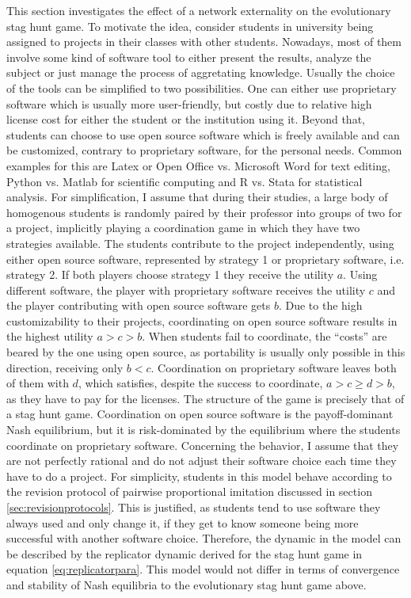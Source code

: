 \label{sec:simplemodel}
This section investigates the effect of a network externality on the
evolutionary stag hunt game.
To motivate the idea, consider students in university being assigned to
projects in their classes with other students. Nowadays, most of them 
involve some kind of software tool to either present the results, analyze 
the subject or just manage the process of aggretating 
knowledge. Usually the choice of the tools can be simplified to two 
possibilities. One can either use proprietary software
which is usually more user-friendly, but costly due to relative high 
license cost for either the student or the institution using it. 
Beyond that, students can choose to use open source software which is freely
available and can be customized, contrary to proprietary software,
for the personal needs. Common examples for this are Latex or Open Office
vs. Microsoft Word for text editing, Python vs. Matlab for scientific 
computing and R vs. Stata for statistical analysis.
For simplification, I assume that during their studies, a large body of 
homogenous students is randomly paired by their professor into groups of two 
for a project, implicitly playing a coordination game in which they have two 
strategies available. The students contribute to the project 
independently, using either open source software, 
represented by strategy 1 or proprietary software, i.e. strategy 2.
If both players choose strategy 1 they receive 
the utility $a$. Using different software, the player with 
proprietary software receives the utility $c$ and
the player contributing with open source software gets $b$.
Due to the high customizability to their projects, coordinating on open
source software results in the highest utility $a>c>b$.
When students fail to coordinate, the ``costs'' are beared
by the one using open source, as portability is usually only possible in 
this direction, receiving only $b<c$.
Coordination on proprietary software leaves both of them with $d$, which 
satisfies, despite the success to coordinate, $a> c\geq d>b$, as they have to
pay for the licenses. 
The structure of the game is precisely that of a stag hunt game. 
Coordination on open source software is the payoff-dominant Nash equilibrium,
but it is risk-dominated by the equilibrium where the students coordinate on
proprietary software. 
Concerning the behavior, I assume that they are not perfectly rational and
do not adjust their software choice each time they have to do a project.
For simplicity, students in this model behave according to the 
revision protocol of pairwise proportional imitation discussed in section 
\ref{sec:revisionprotocols}. 
This is justified, as students tend to use software they always used and 
only change it, if they get to know someone being more successful with
another software choice. Therefore, the dynamic in the model can be 
described by the replicator dynamic derived for the stag hunt game in 
equation \eqref{eq:replicatorpara}.
This model would not differ in terms of convergence and stability of Nash 
equilibria to the evolutionary stag hunt game above.

